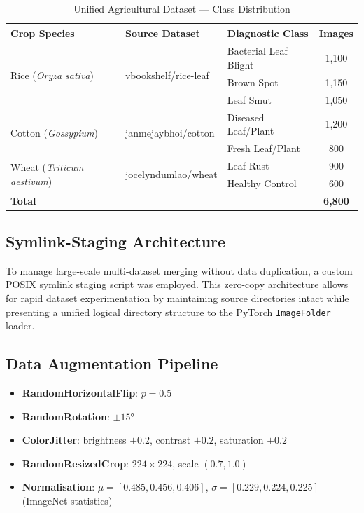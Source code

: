 \documentclass[12pt,oneside]{report}
\begin{document}
\begin{table}[H]
\centering
\caption{Unified Agricultural Dataset — Class Distribution}
\begin{tabular}{@{}lllc@{}}
\toprule
\textbf{Crop Species} & \textbf{Source Dataset} & \textbf{Diagnostic Class} & \textbf{Images} \\ \midrule
\multirow{3}{*}{Rice (\textit{Oryza sativa})} & \multirow{3}{*}{vbookshelf/rice-leaf} & Bacterial Leaf Blight & 1,100 \\
 &  & Brown Spot & 1,150 \\
 &  & Leaf Smut & 1,050 \\ \midrule
\multirow{2}{*}{Cotton (\textit{Gossypium})} & \multirow{2}{*}{janmejaybhoi/cotton} & Diseased Leaf/Plant & 1,200 \\
 &  & Fresh Leaf/Plant & 800 \\ \midrule
\multirow{2}{*}{Wheat (\textit{Triticum aestivum})} & \multirow{2}{*}{jocelyndumlao/wheat} & Leaf Rust & 900 \\
 &  & Healthy Control & 600 \\ \midrule
\multicolumn{3}{l}{\textbf{Total}} & \textbf{6,800} \\ \bottomrule
\end{tabular}
\end{table}

\subsection{Symlink-Staging Architecture}
To manage large-scale multi-dataset merging without data duplication, a custom POSIX symlink staging script was employed. This zero-copy architecture allows for rapid dataset experimentation by maintaining source directories intact while presenting a unified logical directory structure to the PyTorch \texttt{ImageFolder} loader.

\subsection{Data Augmentation Pipeline}
\begin{itemize}
    \item \textbf{RandomHorizontalFlip}: $p = 0.5$
    \item \textbf{RandomRotation}: $\pm15°$
    \item \textbf{ColorJitter}: brightness $\pm 0.2$, contrast $\pm 0.2$, saturation $\pm 0.2$
    \item \textbf{RandomResizedCrop}: $224 \times 224$, scale $(0.7, 1.0)$
    \item \textbf{Normalisation}: $\mu = [0.485, 0.456, 0.406]$, $\sigma = [0.229, 0.224, 0.225]$ (ImageNet statistics)
\end{itemize}
\end{document}
